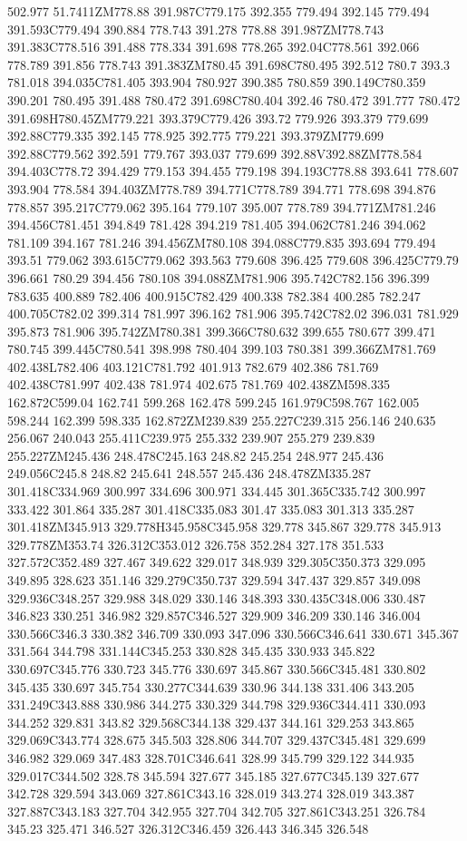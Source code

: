 502.977 51.7411ZM778.88 391.987C779.175 392.355 779.494 392.145 779.494 391.593C779.494 390.884 778.743 391.278 778.88 391.987ZM778.743 391.383C778.516 391.488 778.334 391.698 778.265 392.04C778.561 392.066 778.789 391.856 778.743 391.383ZM780.45 391.698C780.495 392.512 780.7 393.3 781.018 394.035C781.405 393.904 780.927 390.385 780.859 390.149C780.359 390.201 780.495 391.488 780.472 391.698C780.404 392.46 780.472 391.777 780.472 391.698H780.45ZM779.221 393.379C779.426 393.72 779.926 393.379 779.699 392.88C779.335 392.145 778.925 392.775 779.221 393.379ZM779.699 392.88C779.562 392.591 779.767 393.037 779.699 392.88V392.88ZM778.584 394.403C778.72 394.429 779.153 394.455 779.198 394.193C778.88 393.641 778.607 393.904 778.584 394.403ZM778.789 394.771C778.789 394.771 778.698 394.876 778.857 395.217C779.062 395.164 779.107 395.007 778.789 394.771ZM781.246 394.456C781.451 394.849 781.428 394.219 781.405 394.062C781.246 394.062 781.109 394.167 781.246 394.456ZM780.108 394.088C779.835 393.694 779.494 393.51 779.062 393.615C779.062 393.563 779.608 396.425 779.608 396.425C779.79 396.661 780.29 394.456 780.108 394.088ZM781.906 395.742C782.156 396.399 783.635 400.889 782.406 400.915C782.429 400.338 782.384 400.285 782.247 400.705C782.02 399.314 781.997 396.162 781.906 395.742C782.02 396.031 781.929 395.873 781.906 395.742ZM780.381 399.366C780.632 399.655 780.677 399.471 780.745 399.445C780.541 398.998 780.404 399.103 780.381 399.366ZM781.769 402.438L782.406 403.121C781.792 401.913 782.679 402.386 781.769 402.438C781.997 402.438 781.974 402.675 781.769 402.438ZM598.335 162.872C599.04 162.741 599.268 162.478 599.245 161.979C598.767 162.005 598.244 162.399 598.335 162.872ZM239.839 255.227C239.315 256.146 240.635 256.067 240.043 255.411C239.975 255.332 239.907 255.279 239.839 255.227ZM245.436 248.478C245.163 248.82 245.254 248.977 245.436 249.056C245.8 248.82 245.641 248.557 245.436 248.478ZM335.287 301.418C334.969 300.997 334.696 300.971 334.445 301.365C335.742 300.997 333.422 301.864 335.287 301.418C335.083 301.47 335.083 301.313 335.287 301.418ZM345.913 329.778H345.958C345.958 329.778 345.867 329.778 345.913 329.778ZM353.74 326.312C353.012 326.758 352.284 327.178 351.533 327.572C352.489 327.467 349.622 329.017 348.939 329.305C350.373 329.095 349.895 328.623 351.146 329.279C350.737 329.594 347.437 329.857 349.098 329.936C348.257 329.988 348.029 330.146 348.393 330.435C348.006 330.487 346.823 330.251 346.982 329.857C346.527 329.909 346.209 330.146 346.004 330.566C346.3 330.382 346.709 330.093 347.096 330.566C346.641 330.671 345.367 331.564 344.798 331.144C345.253 330.828 345.435 330.933 345.822 330.697C345.776 330.723 345.776 330.697 345.867 330.566C345.481 330.802 345.435 330.697 345.754 330.277C344.639 330.96 344.138 331.406 343.205 331.249C343.888 330.986 344.275 330.329 344.798 329.936C344.411 330.093 344.252 329.831 343.82 329.568C344.138 329.437 344.161 329.253 343.865 329.069C343.774 328.675 345.503 328.806 344.707 329.437C345.481 329.699 346.982 329.069 347.483 328.701C346.641 328.99 345.799 329.122 344.935 329.017C344.502 328.78 345.594 327.677 345.185 327.677C345.139 327.677 342.728 329.594 343.069 327.861C343.16 328.019 343.274 328.019 343.387 327.887C343.183 327.704 342.955 327.704 342.705 327.861C343.251 326.784 345.23 325.471 346.527 326.312C346.459 326.443 346.345 326.548 